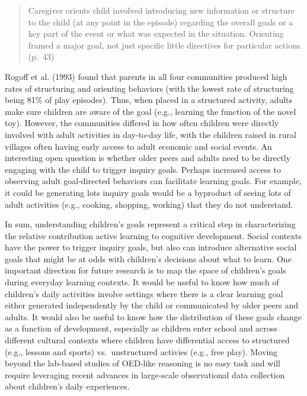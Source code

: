 \documentclass[english,floatsintext,man]{apa6}
\theoremstyle{definition}
\theoremstyle{definition}
\theoremstyle{definition}
\theoremstyle{remark}
\begin{document}
\begin{quote}
Caregiver orients child involved introducing new information or
structure to the child (at any point in the episode) regarding the
overall goals or a key part of the event or what was expected in the
situation. Orienting framed a major goal, not just specific little
directives for particular actions. (p.~43)
\end{quote}

\noindent
Rogoff et al. (1993) found that parents in all four communities produced
high rates of structuring and orienting behaviors (with the lowest rate
of structuring being 81\% of play episodes). Thus, when placed in a
structured activity, adults make sure children are aware of the goal
(e.g., learning the function of the novel toy). However, the communities
differed in how often children were directly involved with adult
activities in day-to-day life, with the children raised in rural
villages often having early access to adult economic and social events.
An interesting open question is whether older peers and adults need to
be directly engaging with the child to trigger inquiry goals. Perhaps
increased access to observing adult goal-directed behaviors can
facilitate learning goals. For example, it could be generating lots
inquiry goals would be a byproduct of seeing lots of adult activities
(e.g., cooking, shopping, working) that they do not understand.

In sum, understanding children's goals represent a critical step in
characterizing the relative contribution active learning to cognitive
development. Social contexts have the power to trigger inquiry goals,
but also can introduce alternative social goals that might be at odds
with children's decisions about what to learn. One important direction
for future research is to map the space of children's goals during
everyday learning contexts. It would be useful to know how much of
children's daily activities involve settings where there is a clear
learning goal either generated independently by the child or
communicated by older peers and adults. It would also be useful to know
how the distribution of these goals change as a function of development,
especially as children enter school and across different cultural
contexts where children have differential access to structured (e.g.,
lessons and sports) vs.~unstructured activies (e.g., free play). Moving
beyond the lab-based studies of OED-like reasoning is no easy task and
will require leveraging recent advances in large-scale observational
data collection about children's daily experiences.
\end{document}
